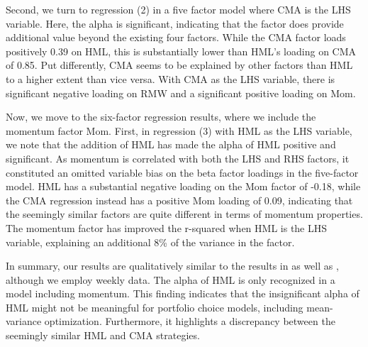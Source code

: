 Second, we turn to regression (2) in a five factor model where CMA is the LHS variable. Here, the alpha is significant, indicating that the factor does provide additional value beyond the existing four factors. While the CMA factor loads positively 0.39 on HML, this is substantially lower than HML's loading on CMA of 0.85. Put differently, CMA seems to be explained by other factors than HML to a higher extent than vice versa. With CMA as the LHS variable, there is significant negative loading on RMW and a significant positive loading on Mom.

Now, we move to the six-factor regression results, where we include the momentum factor Mom. First, in regression (3) with HML as the LHS variable, we note that the addition of HML has made the alpha of HML positive and significant. As momentum is correlated with both the LHS and RHS factors, it constituted an omitted variable bias on the beta factor loadings in the five-factor model. HML has a substantial negative loading on the Mom factor of -0.18, while the CMA regression instead has a positive Mom loading of 0.09, indicating that the seemingly similar factors are quite different in terms of momentum properties. The momentum factor has improved the r-squared when HML is the LHS variable, explaining an additional 8\% of the variance in the factor.

In summary, our results are qualitatively similar to the results in \textcite{FF2015} as well as \textcite{Asness2015}, although we employ weekly data. The alpha of HML is only recognized in a model including momentum. This finding indicates that the insignificant alpha of HML might not be meaningful for portfolio choice models, including mean-variance optimization. Furthermore, it highlights a discrepancy between the seemingly similar HML and CMA strategies.

